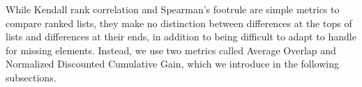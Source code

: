 While Kendall rank correlation \cite{kendallNewMeasureRank1938c} and Spearman's footrule  \cite{spearmanCorrelationCalculatedFaulty1910} are simple metrics to compare ranked lists, they make no distinction between differences at the tops of lists and differences at their ends, in addition to being difficult to adapt to handle for missing elements.
Instead, we use two metrics called Average Overlap and Normalized Discounted Cumulative Gain, which we introduce in the following subsections.
%
%
%
%
%
%
%
%
%

